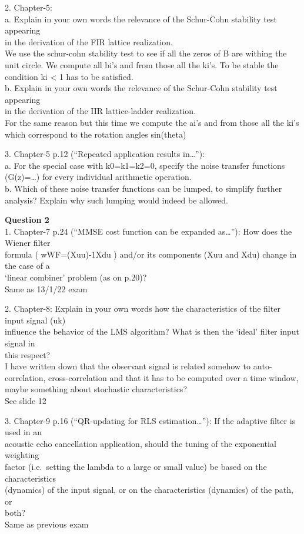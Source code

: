 \documentclass[
  a4paper,
  ,captions=tableheading
]{scrartcl}
\begin{document}
2. Chapter-5:\\
a. Explain in your own words the relevance of the Schur-Cohn stability
test appearing\\
in the derivation of the FIR lattice realization.\\
We use the schur-cohn stability test to see if all the zeros of B are
withing the unit circle. We compute all bi's and from those all the
ki's. To be stable the condition \textbar ki\textbar{} \textless{} 1 has
to be satisfied.\\
b. Explain in your own words the relevance of the Schur-Cohn stability
test appearing\\
in the derivation of the IIR lattice-ladder realization.\\
For the same reason but this time we compute the ai's and from those all
the ki's which correspond to the rotation angles sin(theta)

3. Chapter-5 p.12 (``Repeated application results in\ldots{}''):\\
a. For the special case with k0=k1=k2=0, specify the noise transfer
functions (G(z)=\ldots) for every individual arithmetic operation.\\
b. Which of these noise transfer functions can be lumped, to simplify
further analysis? Explain why such lumping would indeed be allowed.

\textbf{Question 2}\\
1. Chapter-7 p.24 (``MMSE cost function can be expanded as\ldots{}''):
How does the Wiener filter\\
formula ( wWF=(Xuu)-1Xdu ) and/or its components (Xuu and Xdu) change in
the case of a\\
`linear combiner' problem (as on p.20)?\\
Same as 13/1/22 exam

2. Chapter-8: Explain in your own words how the characteristics of the
filter input signal (uk)\\
influence the behavior of the LMS algorithm? What is then the `ideal'
filter input signal in\\
this respect?\\
I have written down that the observant signal is related somehow to
auto-correlation, cross-correlation and that it has to be computed over
a time window, maybe something about stochastic characteristics?\\
See slide 12

3. Chapter-9 p.16 (``QR-updating for RLS estimation\ldots{}''): If the
adaptive filter is used in an\\
acoustic echo cancellation application, should the tuning of the
exponential weighting\\
factor (i.e.~setting the lambda to a large or small value) be based on
the characteristics\\
(dynamics) of the input signal, or on the characteristics (dynamics) of
the path, or\\
both?\\
Same as previous exam
\end{document}
